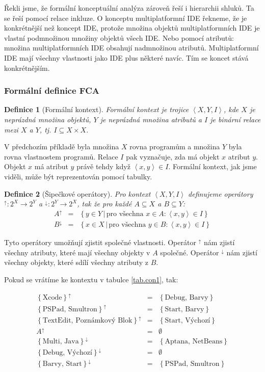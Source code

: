 \documentclass[12pt]{article}
\newcommand{\sep}{\,|\,}
\newcommand{\foreach}{\mbox{pro všechna }}
\newcommand{\sssection}[1]{\subsubsection{#1}}
\newcommand{\adds}[1]{\left\{#1\right\}}
\newcommand{\addsp}[1]{\left<#1\right>}
\newcommand{\context}{\addsp{X, Y, I}}
\newcommand{\up}{^{\uparrow}}
\newcommand{\down}{^{\downarrow}}
\newtheorem{mydef}{Definice}
\begin{document}
Řekli jsme, že formální konceptuální analýza zároveň řeší i hierarchii shluků. Ta se řeší pomocí relace inkluze. O konceptu multiplatformní IDE řekneme, že je konkrétnější než koncept IDE, protože množina objektů multiplatformních IDE je vlastní podmnožinou množiny objektů všech IDE. Nebo pomocí atributů: množina multiplatformních IDE obsahují nadmnožinou atributů. Multiplatformní IDE mají všechny vlastnosti jako IDE plus některé navíc. Tím se koncet stává konkrétnějším. 

\sssection{Formální definice FCA}

\begin{mydef}[Formální kontext]
Formální kontext je trojice $\addsp{X, Y, I}$, kde $X$ je neprázdná množina objektů, $Y$ je neprázdná množina atributů a $I$ je binární relace mezi $X$ a $Y$, tj. $I\subseteq X\times X$.
\end{mydef}

V předchozím příkladě byla množina $X$ rovna programům a množina $Y$ byla rovna vlastnostem programů. Relace $I$ pak vyznačuje, zda má objekt $x$ atribut $y$. Objekt $x$ má atribut $y$ právě tehdy když $\addsp{x, y}\in I$. Formální kontext, jak jsme viděli, může být reprezentován pomocí tabulky. 

\begin{mydef}[Šipečkové operátory]
Pro kontext $\context$ definujeme operátory $\up:2^X\rightarrow2^Y$ a $\down:2^Y\rightarrow2^X$, tak že pro každé $A\subseteq X$ a $B\subseteq Y$:
\begin{eqnarray}
A\up&=&\adds{y\in Y\sep \foreach x \in A: \addsp{x, y}\in I}\\
B\down&=&\adds{x\in X\sep\foreach y\in B:\addsp{x, y} \in I}
\end{eqnarray}
\end{mydef}

Tyto operátory umožňují zjistit společné vlastnosti. Operátor $\up$ nám zjistí všechny atributy, které mají všechny objekty v $A$ společné. Operátor $\down$ nám zjistí všechny objekty, které sdílí všechny atributy z $B$. 

Pokud se vrátíme ke kontextu v tabulce \ref{tab.con1}, tak:

\begin{eqnarray*}
\adds{\mbox{Xcode}}\up&=&\adds{\mbox{Debug, Barvy}}\\
\adds{\mbox{PSPad, Smultron}}\up&=&\adds{\mbox{Start, Barvy}}\\
\adds{\mbox{TextEdit, Poznámkový Blok}}\up&=&\adds{\mbox{Start, Výchozí}}\\
A\up&=&\emptyset\\
\adds{\mbox{Multi, Java}}\down&=&\adds{\mbox{Aptana, NetBeans}}\\
\adds{\mbox{Debug, Výchozí}}\down&=&\emptyset\\
\adds{\mbox{Barvy, Start}}\down&=&\adds{\mbox{PSPad, Smultron}}
\end{eqnarray*}
\end{document}
